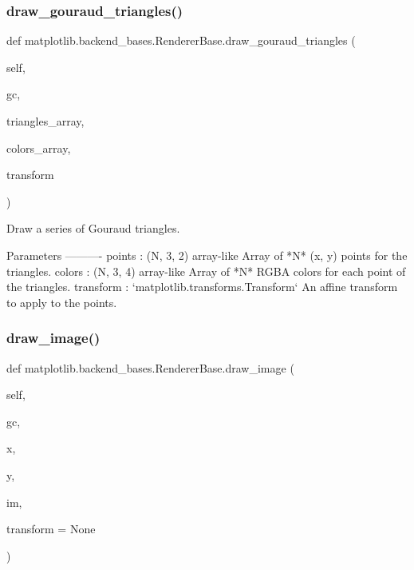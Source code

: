 \subsubsection{\texorpdfstring{draw\+\_\+gouraud\+\_\+triangles()}{draw\_gouraud\_triangles()}}
{\footnotesize\ttfamily def matplotlib.\+backend\+\_\+bases.\+Renderer\+Base.\+draw\+\_\+gouraud\+\_\+triangles (\begin{DoxyParamCaption}\item[{}]{self,  }\item[{}]{gc,  }\item[{}]{triangles\+\_\+array,  }\item[{}]{colors\+\_\+array,  }\item[{}]{transform }\end{DoxyParamCaption})}

\begin{DoxyVerb}Draw a series of Gouraud triangles.

Parameters
----------
points : (N, 3, 2) array-like
    Array of *N* (x, y) points for the triangles.
colors : (N, 3, 4) array-like
    Array of *N* RGBA colors for each point of the triangles.
transform : `matplotlib.transforms.Transform`
    An affine transform to apply to the points.
\end{DoxyVerb}
 \mbox{\label{classmatplotlib_1_1backend__bases_1_1RendererBase_aef918271afa5633f931c0c52a7248542}} 
\subsubsection{\texorpdfstring{draw\+\_\+image()}{draw\_image()}}
{\footnotesize\ttfamily def matplotlib.\+backend\+\_\+bases.\+Renderer\+Base.\+draw\+\_\+image (\begin{DoxyParamCaption}\item[{}]{self,  }\item[{}]{gc,  }\item[{}]{x,  }\item[{}]{y,  }\item[{}]{im,  }\item[{}]{transform = {\ttfamily None} }\end{DoxyParamCaption})}


